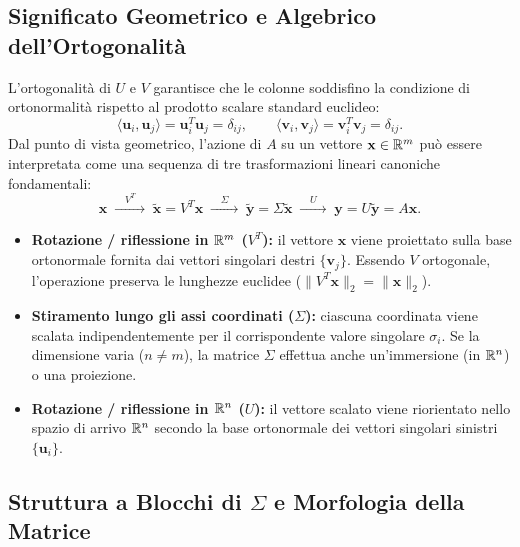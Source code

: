 \subsection{Significato Geometrico e Algebrico dell'Ortogonalit\`a}

L'ortogonalit\`a di $U$ e $V$ garantisce che le colonne soddisfino la condizione di ortonormalit\`a rispetto al prodotto scalare standard euclideo:
\begin{equation}
    \langle \mathbf{u}_i, \mathbf{u}_j \rangle = \mathbf{u}_i^T \mathbf{u}_j = \delta_{ij}, \qquad \langle \mathbf{v}_i, \mathbf{v}_j \rangle = \mathbf{v}_i^T \mathbf{v}_j = \delta_{ij}.
\end{equation}
Dal punto di vista geometrico, l'azione di $A$ su un vettore $\mathbf{x} \in \mathbb{R}^m$ pu\`o essere interpretata come una sequenza di tre trasformazioni lineari canoniche fondamentali:
\begin{equation}
    \mathbf{x} \;\xrightarrow{\quad V^T \quad}\; \tilde{\mathbf{x}} = V^T \mathbf{x} \;\xrightarrow{\quad \Sigma \quad}\; \tilde{\mathbf{y}} = \Sigma \tilde{\mathbf{x}} \;\xrightarrow{\quad U \quad}\; \mathbf{y} = U \tilde{\mathbf{y}} = A\mathbf{x}.
\end{equation}
\begin{itemize}
    \item \textbf{Rotazione / riflessione in $\mathbb{R}^m$ ($V^T$):} il vettore $\mathbf{x}$ viene proiettato sulla base ortonormale fornita dai vettori singolari destri $\{\mathbf{v}_j\}$. Essendo $V$ ortogonale, l'operazione preserva le lunghezze euclidee ($\|V^T \mathbf{x}\|_2 = \|\mathbf{x}\|_2$).
    \item \textbf{Stiramento lungo gli assi coordinati ($\Sigma$):} ciascuna coordinata viene scalata indipendentemente per il corrispondente valore singolare $\sigma_i$. Se la dimensione varia ($n \neq m$), la matrice $\Sigma$ effettua anche un'immersione (in $\mathbb{R}^n$) o una proiezione.
    \item \textbf{Rotazione / riflessione in $\mathbb{R}^n$ ($U$):} il vettore scalato viene riorientato nello spazio di arrivo $\mathbb{R}^n$ secondo la base ortonormale dei vettori singolari sinistri $\{\mathbf{u}_i\}$.
\end{itemize}

\subsection{Struttura a Blocchi di \texorpdfstring{$\Sigma$}{Sigma} e Morfologia della Matrice}

